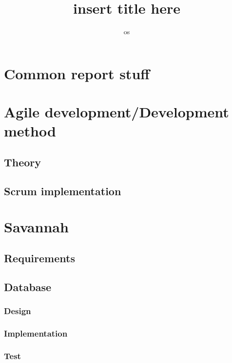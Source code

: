 

\title{insert title here} %
\author{os} %


\maketitle
\tableofcontents

\chapter{Common report stuff} %

\chapter{Agile development/Development method} %
 \section{Theory}
	
 \section{Scrum implementation}
	
 
\chapter{Savannah} %
  \section{Requirements} %
  \section{Database}
  	
    \subsection{Design}
    	
    \subsection{Implementation}
    	
    \subsection{Test}

